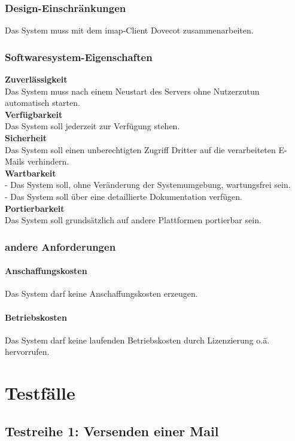 \subsection{Design-Einschränkungen}
Das System muss mit dem \ac{imap}-Client Dovecot zusammenarbeiten.
\subsection{Softwaresystem-Eigenschaften}
\label{sec:zuverl}
\textbf{Zuverlässigkeit} \\
Das System muss nach einem Neustart des Servers ohne Nutzerzutun automatisch starten.\\
\textbf{Verfügbarkeit} \\
Das System soll jederzeit zur Verfügung stehen.\\
\textbf{Sicherheit} \\
Das System soll einen unberechtigten Zugriff Dritter auf die verarbeiteten E-Mails verhindern.\\
\textbf{Wartbarkeit} \\
- Das System soll, ohne Veränderung der Systemumgebung, wartungsfrei sein.\\
- Das System soll über eine detaillierte Dokumentation verfügen.\\
\textbf{Portierbarkeit} \\
Das System soll grundsätzlich auf andere Plattformen portierbar sein.\\

\subsection{andere Anforderungen}
\subsubsection*{Anschaffungskosten}
Das System darf keine Anschaffungskosten erzeugen.
\subsubsection*{Betriebskosten}
Das System darf keine laufenden Betriebskosten durch Lizenzierung o.ä. hervorrufen.


\chapter{Testfälle}
\label{ch:Testfaelle}

\section{Testreihe 1: Versenden einer Mail}
